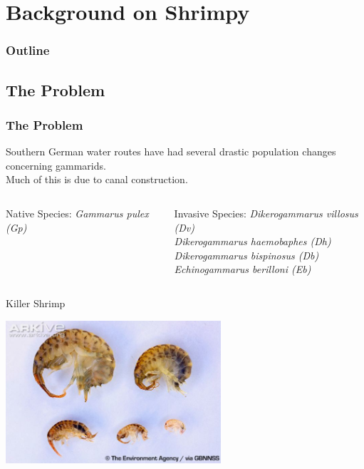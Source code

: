 \section{Background on Shrimpy}


\begin{frame}
  \frametitle{Outline}
  \tableofcontents[ currentsection ]
\end{frame}

\subsection{The Problem}

\begin{frame}
  \frametitle{The Problem}

  Southern German water routes have had several drastic population changes concerning gammarids. \\
\vspace{1em}
Much of this is due to canal construction. 

  \begin{columns}[t]
	\begin{block}{Native Species:}
	\textit{Gammarus pulex (Gp)}
	\end{block}

	\begin{block}{Invasive Species:}
    	\textit{Dikerogammarus villosus (Dv)}\\	
	\textit{Dikerogammarus haemobaphes (Dh)}\\
	\textit{Dikerogammarus bispinosus (Db)}\\
	\textit{Echinogammarus berilloni (Eb)}
	\end{block}
  \end{columns}
\end{frame}

\begin{frame}{Killer Shrimp}
\centerline{\includegraphics[width=8cm]{img/shrimpy1}}
\end{frame}

